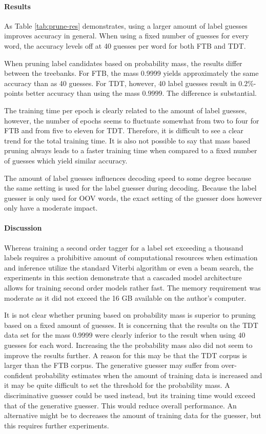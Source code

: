 \paragraph{Results} As Table \ref{tab:prune-res} demonstrates, using a
larger amount of label guesses improves accuracy in general. When
using a fixed number of guesses for every word, the accuracy levels
off at 40 guesses per word for both FTB and TDT.

When pruning label candidates based on probability mass, the results
differ between the treebanks. For FTB, the mass 0.9999 yields
approximately the same accuracy than as 40 guesses. For TDT, however,
40 label guesses result in $0.2\%$-points better accuracy than using
the mass $0.9999$. The difference is substantial.

The training time per epoch is clearly related to the amount of label
guesses, however, the number of epochs seems to fluctuate somewhat
from two to four for FTB and from five to eleven for TDT. Therefore,
it is difficult to see a clear trend for the total training time. It
is also not possible to say that mass based pruning always leads to a
faster training time when compared to a fixed number of guesses which
yield similar accuracy.

The amount of label guesses influences decoding speed to some degree
because the same setting is used for the label guesser during
decoding. Because the label guesser is only used for OOV words, the
exact setting of the guesser does however only have a moderate impact.

\paragraph{Discussion} Whereas training a second order tagger for a
label set exceeding a thousand labels requires a prohibitive amount of
computational resources when estimation and inference utilize the
standard Viterbi algorithm or even a beam search, the experiments in
this section demonstrate that a cascaded model architecture allows for
training second order models rather fast. The memory requirement was
moderate as it did not exceed the 16 GB available on the author's
computer.

It is not clear whether pruning based on probability mass is superior
to pruning based on a fixed amount of guesses. It is concerning that
the results on the TDT data set for the mass $0.9999$ were clearly
inferior to the result when using $40$ guesses for each
word. Increasing the the probability mass also did not seem to improve
the results further. A reason for this may be that the TDT corpus is
larger than the FTB corpus. The generative guesser may suffer from
over-confident probability estimates when the amount of training data
is increased and it may be quite difficult to set the threshold for
the probability mass. A discriminative guesser could be used instead,
but its training time would exceed that of the generative
guesser. This would reduce overall performance. An alternative might
be to decreases the amount of training data for the guesser, but this
requires further experiments.

